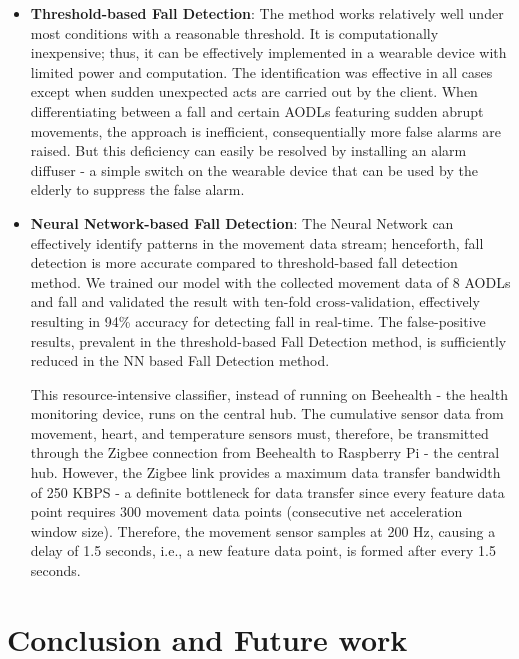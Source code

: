 \begin{itemize}
\item \textbf{Threshold-based Fall Detection}: The method works relatively well under most conditions with a reasonable threshold. It is computationally inexpensive; thus, it can be effectively implemented in a wearable device with limited power and computation. The identification was effective in all cases except when sudden unexpected acts are carried out by the client. When differentiating between a fall and certain AODLs featuring sudden abrupt movements, the approach is inefficient, consequentially more false alarms are raised. But this deficiency can easily be resolved by installing an alarm diffuser - a simple switch on the wearable device that can be used by the elderly to suppress the false alarm.

\item \textbf{Neural Network-based Fall Detection}: The Neural Network can effectively identify patterns in the movement data stream; henceforth, fall detection is more accurate compared to threshold-based fall detection method. We trained our model with the collected movement data of 8 AODLs and fall and validated the result with ten-fold cross-validation, effectively resulting in 94\% accuracy for detecting fall in real-time. The false-positive results, prevalent in the threshold-based Fall Detection method, is sufficiently reduced in the NN based Fall Detection method. 

This resource-intensive classifier, instead of running on Beehealth - the health monitoring device, runs on the central hub. The cumulative sensor data from movement, heart, and temperature sensors must, therefore, be transmitted through the Zigbee connection from Beehealth to Raspberry Pi - the central hub. However, the Zigbee link provides a maximum data transfer bandwidth of 250 KBPS - a definite bottleneck for data transfer since every feature data point requires 300 movement data points (consecutive net acceleration window size). Therefore, the movement sensor samples at 200 Hz, causing a delay of 1.5 seconds, i.e., a new feature data point, is formed after every 1.5 seconds.
\end{itemize}


\section{Conclusion and Future work}
